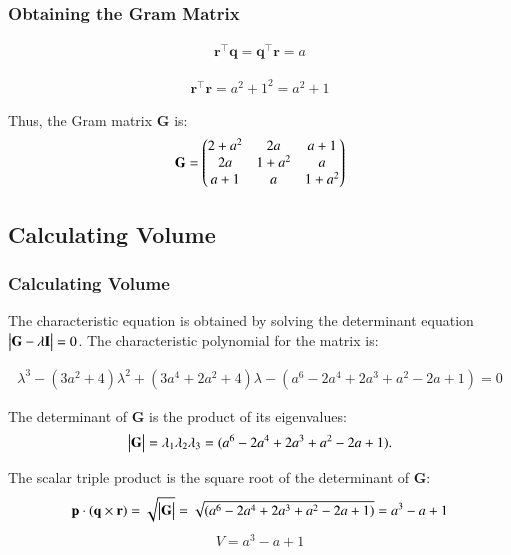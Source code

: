 \documentclass{beamer}
\theoremstyle{remark}
\let\vec\mathbf
\numberwithin{equation}{section}
\begin{document}
\begin{frame}
\frametitle{Obtaining the Gram Matrix}
\begin{align}
\vec{r}^\top \vec{q} = \vec{q}^\top \vec{r} = a
\end{align}

\begin{align}
\vec{r}^\top \vec{r} = a^2 + 1^2 = a^2 + 1 
\end{align}

Thus, the Gram matrix $ \vec{G} $ is:
\begin{align}
\vec{G} = \myvec{
2+a^2 & 2a & a+1 \\
2a & 1+a^2 & a \\
a+1 & a & 1+a^2
}
\end{align}
\end{frame}
\subsection{Calculating Volume}
\begin{frame}[fragile]
\frametitle{Calculating Volume}
    The characteristic equation is obtained by solving the determinant equation $ \mydet{\vec{G} - \lambda \vec{I}} = 0 $. The characteristic polynomial for the matrix is:

\begin{align}
\lambda^3 - (3a^2+4)\lambda^2 + (3a^4+2a^2+4)\lambda - (a^6-2a^4+2a^3+a^2-2a+1) = 0
\end{align}

The determinant of $ \vec{G} $ is the product of its eigenvalues:
\begin{align}
\mydet{\vec{G}} = \lambda_1 \lambda_2 \lambda_3 = (a^6-2a^4+2a^3+a^2-2a+1).
\end{align}


The scalar triple product is the square root of the determinant of \( \vec{G} \):
\begin{align}
\vec{p} \cdot (\vec{q} \times \vec{r}) = \sqrt{\mydet{\vec{G}}} = \sqrt{(a^6-2a^4+2a^3+a^2-2a+1)} = a^3-a+1
\end{align}
\begin{align}
    V=a^3-a+1
\end{align}
\end{frame}
\end{document}
